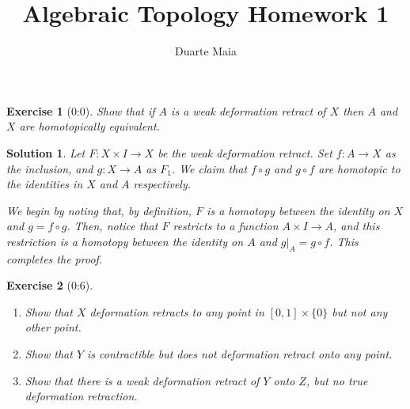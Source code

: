 \documentclass{article}
\title{Algebraic Topology Homework 1}
\author{Duarte Maia}
\theoremstyle{plain}
\newtheorem*{ex}{Exercise}
\theoremstyle{nonumberplain}
\newtheorem{sol}{Solution}
\begin{document}
\maketitle

\begin{ex}[0:0]
Show that if $A$ is a weak deformation retract of $X$ then $A$ and $X$ are homotopically equivalent.
\end{ex}

\begin{sol}
Let $F \colon X \times I \to X$ be the weak deformation retract. Set $f \colon A \to X$ as the inclusion, and $g \colon X \to A$ as $F_1$. We claim that $f \circ g$ and $g \circ f$ are homotopic to the identities in $X$ and $A$ respectively.

We begin by noting that, by definition, $F$ is a homotopy between the identity on $X$ and $g = f \circ g$. Then, notice that $F$ restricts to a function $A \times I \to A$, and this restriction is a homotopy between the identity on $A$ and $g|_A = g \circ f$. This completes the proof.
\end{sol}

\begin{ex}[0:6]
\leavevmode
\begin{enumerate}
\item Show that $X$ deformation retracts to any point in $[0,1] \times \{0\}$ but not any other point.

\item Show that $Y$ is contractible but does not deformation retract onto any point.

\item Show that there is a weak deformation retract of $Y$ onto $Z$, but no true deformation retraction.
\end{enumerate}
\end{ex}
\end{document}
